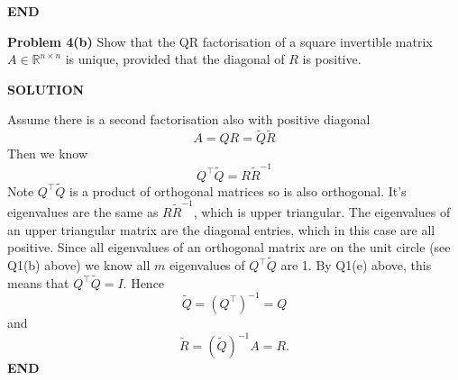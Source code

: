 \documentclass[12pt,a4paper]{article}
\def\bbR{ {\mathbb R} }
\def\Qt{ {\tilde Q} }
\def\Rt{ {\tilde R} }
\begin{document}
\textbf{END}

\textbf{Problem 4(b)} Show that the QR factorisation of a square invertible matrix $A \ensuremath{\in} \ensuremath{\bbR}^{n \ensuremath{\times} n}$ is unique, provided that the diagonal of $R$ is positive.

\textbf{SOLUTION}

Assume there is a second factorisation also with positive diagonal
\[
A = QR = \Qt  \Rt
\]
Then we know
\[
Q^\ensuremath{\top} \Qt  = R \Rt^{-1}
\]
Note $Q^\ensuremath{\top} \Qt $ is a product of orthogonal matrices so is also orthogonal. It's eigenvalues are the same as $R \Rt^{-1}$, which is upper triangular. The eigenvalues of an upper triangular matrix are the diagonal entries, which in this case are all positive. Since all eigenvalues of an orthogonal matrix are on the unit circle (see Q1(b) above) we know all $m$ eigenvalues of $Q^\ensuremath{\top} \Qt$ are 1. By Q1(e) above, this means that $Q^\ensuremath{\top} \Qt  = I$. Hence
\[
\Qt = (Q^\ensuremath{\top})^{-1} = Q
\]
and
\[
\Rt = (\Qt)^{-1}A =  R.
\]
\textbf{END}
\end{document}
